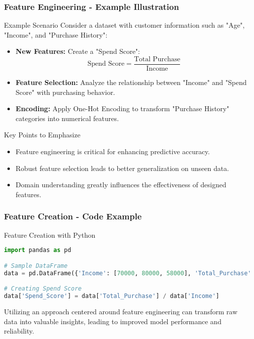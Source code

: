 \documentclass[aspectratio=169]{beamer}
\begin{document}
\begin{frame}[fragile]
    \frametitle{Feature Engineering - Example Illustration}
    \begin{block}{Example Scenario}
        Consider a dataset with customer information such as "Age", "Income", and "Purchase History":
        \begin{itemize}
            \item \textbf{New Features:} Create a "Spend Score":
            \begin{equation}
                \text{Spend Score} = \frac{\text{Total Purchase}}{\text{Income}}
            \end{equation}
            \item \textbf{Feature Selection:} Analyze the relationship between "Income" and "Spend Score" with purchasing behavior.
            \item \textbf{Encoding:} Apply One-Hot Encoding to transform "Purchase History" categories into numerical features.
        \end{itemize}
    \end{block}

    \begin{block}{Key Points to Emphasize}
        \begin{itemize}
            \item Feature engineering is critical for enhancing predictive accuracy.
            \item Robust feature selection leads to better generalization on unseen data.
            \item Domain understanding greatly influences the effectiveness of designed features.
        \end{itemize}
    \end{block}
\end{frame}

\begin{frame}[fragile]
    \frametitle{Feature Creation - Code Example}
    \begin{block}{Feature Creation with Python}
        \begin{lstlisting}[language=Python]
import pandas as pd

# Sample DataFrame
data = pd.DataFrame({'Income': [70000, 80000, 58000], 'Total_Purchase': [3000, 4400, 1500]})

# Creating Spend Score
data['Spend_Score'] = data['Total_Purchase'] / data['Income']
        \end{lstlisting}
    \end{block}
    Utilizing an approach centered around feature engineering can transform raw data into valuable insights, leading to improved model performance and reliability.
\end{frame}
\end{document}
